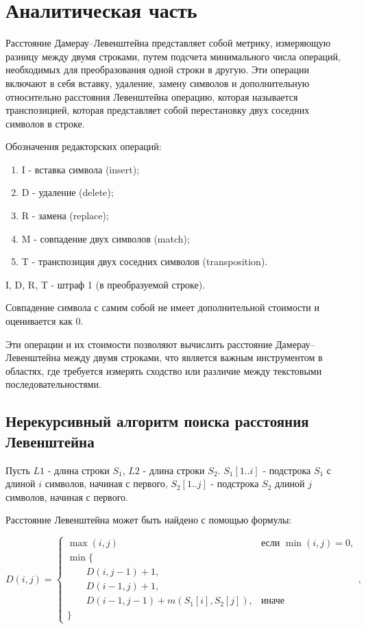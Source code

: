 \section{Аналитическая часть}

Расстояние Дамерау--Левенштейна представляет собой метрику, измеряющую разницу между двумя строками, путем подсчета минимального числа операций, необходимых для преобразования одной строки в другую.
Эти операции включают в себя вставку, удаление, замену символов и дополнительную относительно расстояния Левенштейна операцию, которая называется транспозицией, которая представляет собой перестановку двух соседних символов в строке. \cite{cyberleninka_modifitsirovannyi_algoritm}

Обозначения редакторских операций:
\begin{enumerate}
	\item I - вставка символа (insert);
	\item D - удаление (delete);
	\item R - замена (replace);
	\item M - совпадение двух символов (match);
	\item T - транспозиция двух соседних символов (transposition).
\end{enumerate}
I, D, R, T - штраф 1 (в преобразуемой строке).

Совпадение символа с самим собой не имеет дополнительной стоимости и оценивается как 0.

Эти операции и их стоимости позволяют вычислить расстояние Дамерау--Левенштейна между двумя строками, что является важным инструментом в областях, где требуется измерять сходство или различие между текстовыми последовательностями.

\subsection{Нерекурсивный алгоритм поиска расстояния Левенштейна}
Пусть $L1$ - длина строки $S_{1}$, $L2$ - длина строки $S_{2}$. 
$S_{1}[1..i]$ - подстрока $S_{1}$ с длиной $i$ символов, начиная с первого, $S_{2}[1..j]$ - подстрока $S_{2}$ длиной $j$ символов, начиная с первого. \cite{levenstein_book}

Расстояние Левенштейна может быть найдено с помощью формулы:

\begin{equation}
	\label{eq:d}
	D(i, j) = \begin{cases} 
		\max(i, j) &\text{если }\min(i, j) = 0, \\
		\min \lbrace \\
	     \qquad D(i, j-1) + 1, \\
	     \qquad D(i-1, j) + 1, \\
	     \qquad D(i-1, j-1) + m(S_{1}[i], S_{2}[j]), &\text{иначе} \\
	     \rbrace
	\end{cases},
\end{equation}

